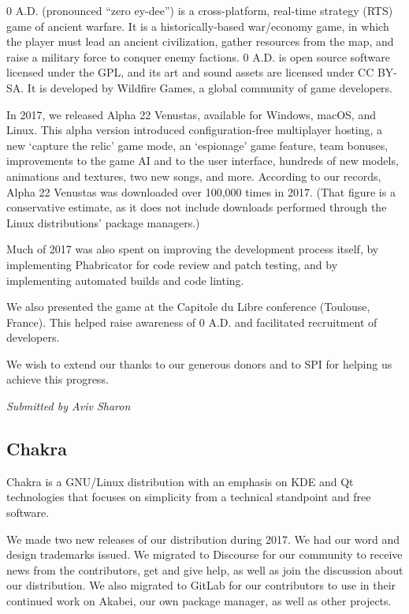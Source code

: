 \documentclass[a4paper]{report}
\begin{document}
0 A.D. (pronounced ``zero ey-dee'') is a cross-platform, real-time
strategy (RTS) game of ancient warfare. It is a historically-based
war/economy game, in which the player must lead an ancient civilization,
gather resources from the map, and raise a military force to conquer
enemy factions. 0 A.D. is open source software licensed under the GPL,
and its art and sound assets are licensed under CC BY-SA. It is
developed by Wildfire Games, a global community of game developers.

In 2017, we released Alpha 22 Venustas, available for Windows, macOS,
and Linux. This alpha version introduced configuration-free multiplayer
hosting, a new `capture the relic' game mode, an `espionage' game
feature, team bonuses, improvements to the game AI and to the user
interface, hundreds of new models, animations and textures, two new
songs, and more.  According to our records, Alpha 22 Venustas was
downloaded over 100,000 times in 2017. (That figure is a conservative
estimate, as it does not include downloads performed through the Linux
distributions' package managers.)

Much of 2017 was also spent on improving the development process itself,
by implementing Phabricator for code review and patch testing, and by
implementing automated builds and code linting.

We also presented the game at the Capitole du Libre conference
(Toulouse, France). This helped raise awareness of 0 A.D. and
facilitated recruitment of developers.

We wish to extend our thanks to our generous donors and to SPI for
helping us achieve this progress.

{\em Submitted by Aviv Sharon}

\subsection{Chakra}

Chakra is a GNU/Linux distribution with an emphasis on KDE and Qt
technologies that focuses on simplicity from a technical standpoint and
free software.

We made two new releases of our distribution during 2017. We had our
word and design trademarks issued. We migrated to Discourse for our
community to receive news from the contributors, get and give help, as
well as join the discussion about our distribution. We also migrated to
GitLab for our contributors to use in their continued work on Akabei,
our own package manager, as well as other projects.
\end{document}
